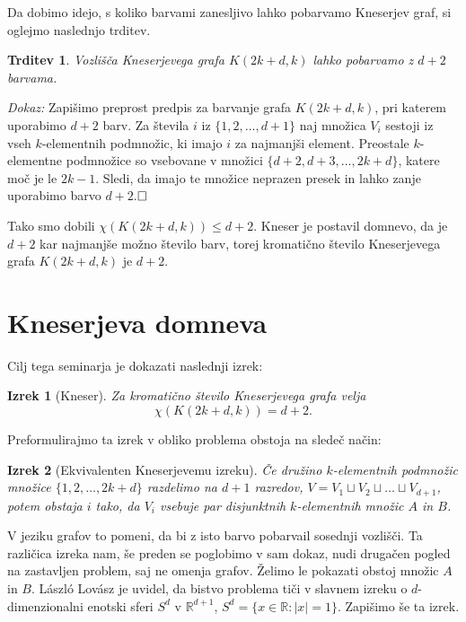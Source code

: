 \documentclass[a4paper,12pt]{article}
\def\qed{$\hfill\Box$}   %
\newtheorem{izrek}{Izrek}
\newtheorem{trditev}{Trditev}
\begin{document}
Da dobimo idejo, s koliko barvami zanesljivo lahko pobarvamo Kneserjev graf, si oglejmo naslednjo trditev.

\begin{trditev}
Vozlišča Kneserjevega grafa $K(2k+d,k)$ lahko pobarvamo z $d+2$ barvama.
\end{trditev}

\noindent
{\em Dokaz:}
Zapišimo preprost predpis za barvanje grafa $K(2k+d,k)$, pri katerem uporabimo $d+2$ barv. Za števila $i$ iz $\{1,2,\ldots,d+1\}$ naj množica $V_i$ sestoji iz vseh $k$-elementnih podmnožic, ki imajo $i$ za najmanjši element. Preostale \mbox{$k$-elementne} podmnožice so vsebovane v množici $\{d+2,d+3,\ldots,2k+d\}$, katere moč je le $2k-1$. Sledi, da imajo te množice neprazen presek in lahko zanje uporabimo barvo $d+2$.\qed

Tako smo dobili $\chi(K(2k+d,k)) \leq d+2$. Kneser je postavil domnevo, da je $d+2$ kar najmanjše možno število barv, torej kromatično število Kneserjevega grafa $K(2k+d,k)$ je $d+2$.

\newpage

\section{Kneserjeva domneva}

Cilj tega seminarja je dokazati naslednji izrek:
\begin{izrek}[Kneser]
Za kromatično število Kneserjevega grafa velja
$$\chi(K(2k+d,k)) = d+2.$$
\end{izrek}

\noindent
Preformulirajmo ta izrek v obliko problema obstoja na sledeč način:

\begin{izrek}[Ekvivalenten Kneserjevemu izreku]
Če družino $k$-elementnih podmnožic množice $\{1, 2, \ldots, 2k+d\}$ razdelimo na $d+1$ razredov,  $V = V_1 \sqcup V_2 \sqcup \ldots \sqcup V_{d+1}$, potem obstaja $i$ tako, da $V_i$ vsebuje par disjunktnih $k$-elementnih množic $A$ in $B$.
\end{izrek}

V jeziku grafov to pomeni, da bi z isto barvo pobarvail sosednji vozlišči. Ta različica izreka nam, še preden se poglobimo v sam dokaz, nudi drugačen pogled na zastavljen problem, saj ne omenja grafov. Želimo le pokazati obstoj množic $A$ in $B$. László Lovász je uvidel, da bistvo problema tiči v slavnem izreku o $d$-dimenzionalni enotski sferi $S^d$ v $\mathbb{R}^{d+1}$, $S^d = \{x \in \mathbb{R}: |x|=1\}$. Zapišimo še ta izrek.
\end{document}
